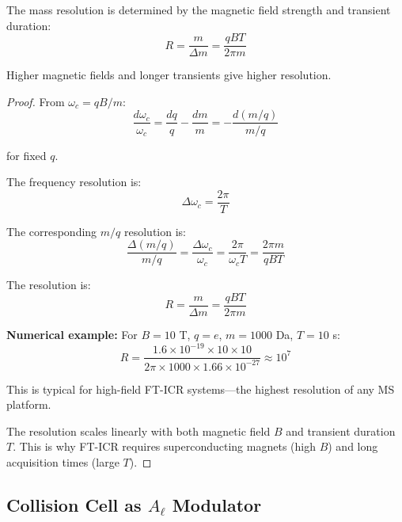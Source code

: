 \begin{corollary}
\label{cor:fticr_resolution}
The mass resolution is determined by the magnetic field strength and transient duration:
\begin{equation}
R = \frac{m}{\Delta m} = \frac{qBT}{2\pi m}
\end{equation}

Higher magnetic fields and longer transients give higher resolution.
\end{corollary}

\begin{proof}
From $\omega_c = qB/m$:
\begin{equation}
\frac{d\omega_c}{\omega_c} = \frac{dq}{q} - \frac{dm}{m} = -\frac{d(m/q)}{m/q}
\end{equation}

for fixed $q$.

The frequency resolution is:
\begin{equation}
\Delta\omega_c = \frac{2\pi}{T}
\end{equation}

The corresponding $m/q$ resolution is:
\begin{equation}
\frac{\Delta(m/q)}{m/q} = \frac{\Delta\omega_c}{\omega_c} = \frac{2\pi}{\omega_c T} = \frac{2\pi m}{qBT}
\end{equation}

The resolution is:
\begin{equation}
R = \frac{m}{\Delta m} = \frac{qBT}{2\pi m}
\end{equation}

\textbf{Numerical example:} For $B = 10$ T, $q = e$, $m = 1000$ Da, $T = 10$ s:
\begin{equation}
R = \frac{1.6 \times 10^{-19} \times 10 \times 10}{2\pi \times 1000 \times 1.66 \times 10^{-27}} \approx 10^7
\end{equation}

This is typical for high-field FT-ICR systems—the highest resolution of any MS platform.

The resolution scales linearly with both magnetic field $B$ and transient duration $T$. This is why FT-ICR requires superconducting magnets (high $B$) and long acquisition times (large $T$).
\end{proof}

\subsection{Collision Cell as $A_\ell$ Modulator}

